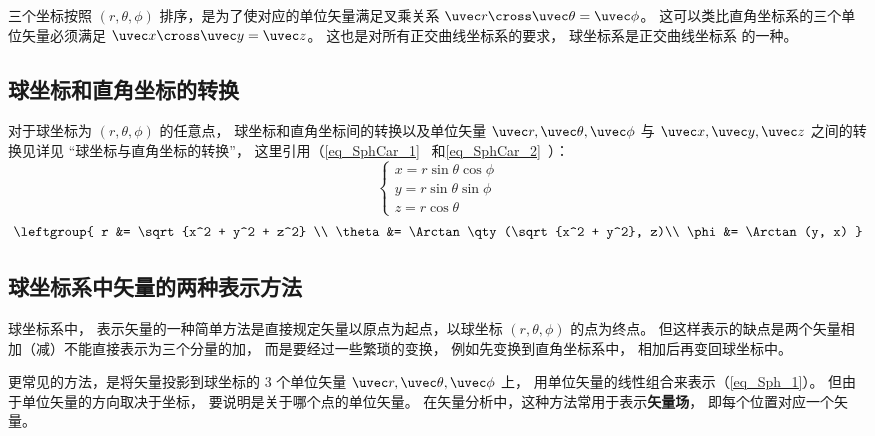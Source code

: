 三个坐标按照 $(r, \theta , \phi )$ 排序，是为了使对应的单位矢量满足叉乘关系 $\uvec r \cross \uvec \theta  = \uvec \phi $。 这可以类比直角坐标系的三个单位矢量必须满足 $\uvec x \cross \uvec y = \uvec z$。 这也是对所有正交曲线坐标系的要求， 球坐标系是正交曲线坐标系 的一种。

\subsection{球坐标和直角坐标的转换}
对于球坐标为 $(r, \theta , \phi )$ 的任意点， 球坐标和直角坐标间的转换以及单位矢量 $\uvec r, \uvec \theta, \uvec \phi$  与 $\uvec x, \uvec y, \uvec z$ 之间的转换见详见 “球坐标与直角坐标的转换”， 这里引用（\autoref{eq_SphCar_1}~ 和\autoref{eq_SphCar_2}~）：
\begin{equation}
\begin{cases}
x = r\sin \theta \cos \phi \\
y = r\sin \theta \sin \phi \\
z = r\cos \theta 
\end{cases}
\end{equation}
\begin{equation}
\leftgroup{
r &= \sqrt {x^2 + y^2 + z^2} \\
\theta  &= \Arctan\qty(\sqrt{x^2 + y^2}, z)\\
\phi  &= \Arctan(y, x)
}\end{equation}


 
\subsection{球坐标系中矢量的两种表示方法}
球坐标系中， 表示矢量的一种简单方法是直接规定矢量以原点为起点，以球坐标 $(r, \theta, \phi)$ 的点为终点。 但这样表示的缺点是两个矢量相加（减）不能直接表示为三个分量的加， 而是要经过一些繁琐的变换， 例如先变换到直角坐标系中， 相加后再变回球坐标中。

更常见的方法，是将矢量投影到球坐标的 3 个单位矢量 $\uvec r, \uvec \theta, \uvec \phi$ 上， 用单位矢量的线性组合来表示（\autoref{eq_Sph_1}）。 但由于单位矢量的方向取决于坐标， 要说明是关于哪个点的单位矢量。 在矢量分析中，这种方法常用于表示\textbf{矢量场}， 即每个位置对应一个矢量。

